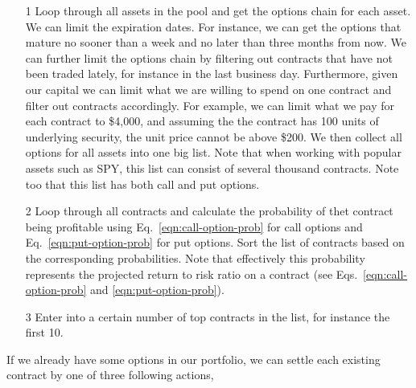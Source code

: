 \documentclass{article}
\begin{document}
\begin{itemize}
  
  \item[1] Loop through all assets in the pool and get the options
    chain for each asset. We can limit the expiration dates. For
    instance, we can get the options that mature no sooner than a week
    and no later than three months from now. We can further limit the
    options chain by filtering out contracts that have not been traded
    lately, for instance in the last business day. Furthermore, given
    our capital we can limit what we are willing to spend on one
    contract and filter out contracts accordingly. For example, we can
    limit what we pay for each contract to \$4,000, and assuming the
    the contract has 100 units of underlying security, the unit price
    cannot be above \$200. We then collect all options for all assets
    into one big list. Note that when working with popular assets such
    as SPY, this list can consist of several thousand contracts. Note
    too that this list has both call and put options.

  \item[2] Loop through all contracts and calculate the probability of
    thet contract being profitable using
    Eq.~\ref{eqn:call-option-prob} for call options and
    Eq.~\ref{eqn:put-option-prob} for put options. Sort the list of
    contracts based on the corresponding probabilities. Note that
    effectively this probability represents the projected return to
    risk ratio on a contract (see Eqs.~\ref{eqn:call-option-prob} and
    \ref{eqn:put-option-prob}).

   \item[3] Enter into a certain number of top contracts in the list,
     for instance the first 10.

\end{itemize}

If we already have some options in our portfolio, we can settle each
existing contract by one of three following actions, 
\end{document}
